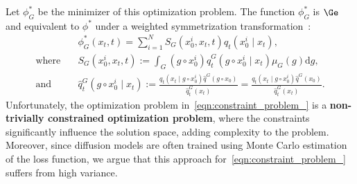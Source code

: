 Let \( \phi^*_G \) be the minimizer of this optimization problem. The function \( \phi^*_G \) is \( \Ge \) and equivalent to \( \phi^* \) under a weighted symmetrization transformation~:
\begin{align}
    &\phi^*_G(x_t, t) = \sum_{i=1}^N S_G(x_0^i, x_t, t) q_t(x_0^i \mid x_t) , \\
    \text{where} \quad &S_G(x_0^i, x_t, t) := \int_G (g \circ x_0^i) \hat{q}^G_t(g \circ x_0^i \mid x_t) \mu_G(g) \mathrm{d} g,\label{eqn:symmetrized_function} \\
    \text{and} \quad &\hat{q}_t^G(g \circ x_0^i \mid x_t) := \frac{q_t(x_t \mid g \circ x_0^i)\hat{q}^G(g 
\circ x_0)}{\hat{q}^G_t(x_t)} = \frac{q_t(x_t \mid g \circ x_0^i)\hat{q}^G(x_0)}{\hat{q}^G_t(x_t)}.
\end{align}
Unfortunately, the optimization problem in~\eqref{eqn:constraint_problem_} is a \textbf{non-trivially constrained optimization problem}, where the constraints significantly influence the solution space, adding complexity to the problem.  Moreover, since diffusion models are often trained using Monte Carlo estimation of the loss function, we argue that this approach for~\eqref{eqn:constraint_problem_} suffers from high variance. 

